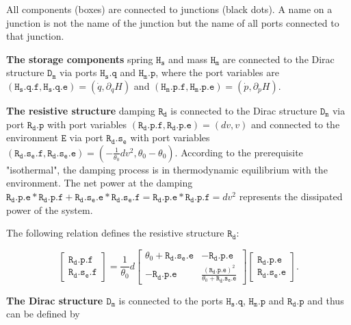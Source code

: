 \documentclass[
	parskip, 			   %
	twoside, 			   %
	DIV=14, 			   %
	BCOR=15.0mm, 		   %
	headsepline, 		   %
	open=right, 		   %
	captions=tableheading, %
	bibliography=totoc,    %
	numbers=noenddot       %
]{scrreprt}
\begin{document}
All components (boxes) are connected to junctions (black dots). A name on a junction is not the name of the junction but the name of all ports connected to that junction.

\textbf{The storage components} spring $\mathtt{H_{s}}$ and mass $\mathtt{H_{m}}$ are connected to the Dirac structure $\mathtt{D_m}$ via ports $\mathtt{H_{s}.q}$ and $\mathtt{H_{m}.p}$, where the port variables are $(\mathtt{H_{s}.q.f}, \mathtt{H_{s}.q.e}) = (\dot{q}, \partial_q H)$ and $(\mathtt{H_{m}.p.f}, \mathtt{H_{m}.p.e}) = (\dot{p}, \partial_p H)$.

\textbf{The resistive structure} damping $\mathtt{R_{d}}$ is connected to the Dirac structure $\mathtt{D_m}$ via port $\mathtt{R_{d}.p}$ with port variables $(\mathtt{R_{d}.p.f}, \mathtt{R_{d}.p.e}) = (dv, v)$ and connected to the environment $\mathtt{E}$ via port $\mathtt{R_{d}.s_{e}}$ with port variables $(\mathtt{R_{d}.s_{e}.f}, \mathtt{R_{d}.s_{e}.e}) = (-\frac{1}{\theta_{0}}dv^2, \theta_{0}-\theta_{0})$. According to the prerequisite "isothermal", the damping process is in thermodynamic equilibrium with the environment. The net power at the damping $\mathtt{R_{d}.p.e} * \mathtt{R_{d}.p.f} + \mathtt{R_{d}.s_{e}.e} * \mathtt{R_{d}.s_{e}.f} = \mathtt{R_{d}.p.e} * \mathtt{R_{d}.p.f} = dv^2$ represents the dissipated power of the system.

The following relation defines the resistive structure $\mathtt{R_d}$:

\begin{equation}
    \label{eq:resistive_structure_idho}
    \left[\begin{array}{l}\mathtt{R_{d}.p.f} \\ \mathtt{R_{d}.s_{e}.f}\end{array}\right]=\frac{1}{\theta_0} d\left[\begin{array}{rr}\theta_0+\mathtt{R_{d}.s_{e}.e} & -\mathtt{R_{d}.p.e} \\ -\mathtt{R_{d}.p.e} & \frac{(\mathtt{R_{d}.p.e})^2}{\theta_0+\mathtt{R_{d}.s_{e}.e}}\end{array}\right]\left[\begin{array}{l}\mathtt{R_{d}.p.e} \\ \mathtt{R_{d}.s_{e}.e}\end{array}\right].
\end{equation}

\textbf{The Dirac structure $\mathtt{D_m}$} is connected to the ports $\mathtt{H_{s}.q}$, $\mathtt{H_{m}.p}$ and $\mathtt{R_{d}.p}$ and thus can be defined by
\end{document}
